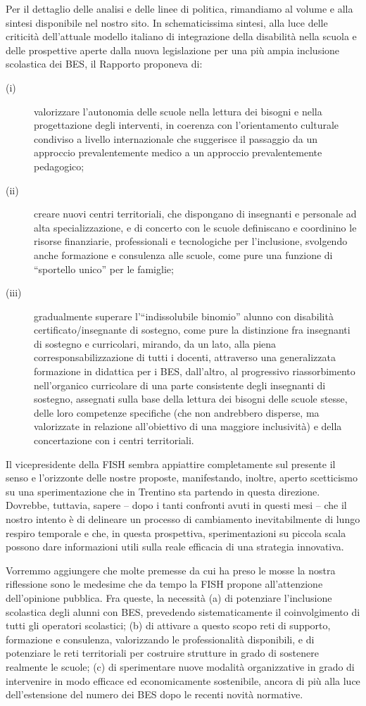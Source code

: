 Per il dettaglio delle analisi e delle linee di politica, rimandiamo al volume e alla sintesi disponibile nel nostro sito. In schematicissima sintesi, alla luce delle criticità dell'attuale modello italiano di integrazione della disabilità nella scuola e delle prospettive aperte dalla nuova legislazione per una più ampia inclusione scolastica dei BES, il Rapporto proponeva di:
\begin{description}
	\item[(i)] valorizzare l'autonomia delle scuole nella lettura dei bisogni e nella progettazione degli interventi, in coerenza con l'orientamento culturale condiviso a livello internazionale che suggerisce il passaggio da un approccio prevalentemente medico a un approccio prevalentemente pedagogico;
	\item[(ii)]creare nuovi centri territoriali, che dispongano di insegnanti e personale ad alta specializzazione, e di concerto con le scuole definiscano e coordinino le risorse finanziarie, professionali e tecnologiche per l’inclusione, svolgendo anche formazione e consulenza alle scuole, come pure una funzione di “sportello unico” per le famiglie;
	\item[(iii)] gradualmente superare l’“indissolubile binomio” alunno con disabilità certificato/insegnante di sostegno, come pure la distinzione fra insegnanti di sostegno e curricolari, mirando, da un lato, alla piena corresponsabilizzazione di tutti i docenti, attraverso una generalizzata formazione in didattica per i BES, dall'altro, al progressivo riassorbimento nell'organico curricolare di una parte consistente degli insegnanti di sostegno, assegnati sulla base della lettura dei bisogni delle scuole stesse, delle loro competenze specifiche (che non andrebbero disperse, ma valorizzate in relazione all'obiettivo di una maggiore inclusività) e della concertazione con i centri territoriali.
\end{description}
Il vicepresidente della FISH sembra appiattire completamente sul presente il senso e l'orizzonte delle nostre proposte, manifestando, inoltre, aperto scetticismo su una sperimentazione che in Trentino sta partendo in questa direzione. Dovrebbe, tuttavia, sapere – dopo i tanti confronti avuti in questi mesi – che il nostro intento è di delineare un processo di cambiamento inevitabilmente di lungo respiro temporale e che, in questa prospettiva, sperimentazioni su piccola scala possono dare informazioni utili sulla reale efficacia di una strategia innovativa.

Vorremmo aggiungere che molte premesse da cui ha preso le mosse la nostra riflessione sono le medesime che da tempo la FISH propone all'attenzione dell'opinione pubblica. Fra queste, la necessità (a) di potenziare l'inclusione scolastica degli alunni con BES, prevedendo sistematicamente il coinvolgimento di tutti gli operatori scolastici; (b) di attivare a questo scopo reti di supporto, formazione e consulenza, valorizzando le professionalità disponibili, e di potenziare le reti territoriali per costruire strutture in grado di sostenere realmente le scuole; (c) di sperimentare nuove modalità organizzative in grado di intervenire in modo efficace ed economicamente sostenibile, ancora di più alla luce dell'estensione del numero dei BES dopo le recenti novità normative.

